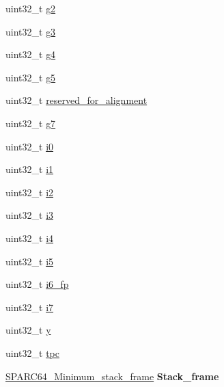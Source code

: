 \begin{DoxyCompactItemize}
\item 
uint32\+\_\+t \mbox{\hyperlink{structCPU__Interrupt__frame_a68395258e92606bba4d3319844603b46}{g2}}
\item 
uint32\+\_\+t \mbox{\hyperlink{structCPU__Interrupt__frame_af633d56bcf28799b00035d62065706ef}{g3}}
\item 
uint32\+\_\+t \mbox{\hyperlink{structCPU__Interrupt__frame_a033a62b6ca235f4d04fe3f9a6502eaeb}{g4}}
\item 
uint32\+\_\+t \mbox{\hyperlink{structCPU__Interrupt__frame_ac7c3c58d0b9d6f7699fb07a26c4c3fb0}{g5}}
\item 
uint32\+\_\+t \mbox{\hyperlink{structCPU__Interrupt__frame_aa80343232748ad4d4536e1aa7cd23c08}{reserved\+\_\+for\+\_\+alignment}}
\item 
uint32\+\_\+t \mbox{\hyperlink{structCPU__Interrupt__frame_abf64e7f2eb3b26bc8d1ee7f65f1424bb}{g7}}
\item 
uint32\+\_\+t \mbox{\hyperlink{structCPU__Interrupt__frame_ad45739f9fd782f91bc46ee1d7dc409ad}{i0}}
\item 
uint32\+\_\+t \mbox{\hyperlink{structCPU__Interrupt__frame_a0ab6a3eb90d055c28713836b04169b55}{i1}}
\item 
uint32\+\_\+t \mbox{\hyperlink{structCPU__Interrupt__frame_a913cea0a105a097aacb501329f8824b4}{i2}}
\item 
uint32\+\_\+t \mbox{\hyperlink{structCPU__Interrupt__frame_a1e91e2cd72d1d671d9ac934f37eb0ef9}{i3}}
\item 
uint32\+\_\+t \mbox{\hyperlink{structCPU__Interrupt__frame_ad89ba5c165cd7f45f9a84a66e335c205}{i4}}
\item 
uint32\+\_\+t \mbox{\hyperlink{structCPU__Interrupt__frame_ad08dfc5a24fcb8da682f8e88774378bc}{i5}}
\item 
uint32\+\_\+t \mbox{\hyperlink{structCPU__Interrupt__frame_a8b8f07180ba126d29cb4c2370136fc55}{i6\+\_\+fp}}
\item 
uint32\+\_\+t \mbox{\hyperlink{structCPU__Interrupt__frame_a985f09c8e136a5ab0e2837f5bee57e65}{i7}}
\item 
uint32\+\_\+t \mbox{\hyperlink{structCPU__Interrupt__frame_ab667f53766f371d6ae54f0a59b885405}{y}}
\item 
uint32\+\_\+t \mbox{\hyperlink{structCPU__Interrupt__frame_a6161bb5e703489990aba7abef9499aa1}{tpc}}
\item 
\mbox{\label{structCPU__Interrupt__frame_afa26b56a7c402f8b9d5482e6a09f01ea}} 
\mbox{\hyperlink{structSPARC64__Minimum__stack__frame}{S\+P\+A\+R\+C64\+\_\+\+Minimum\+\_\+stack\+\_\+frame}} {\bfseries Stack\+\_\+frame}

\end{DoxyCompactItemize}
